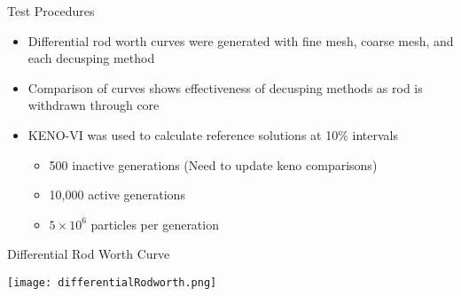 \begin{frame}[t]{Test Procedures}
    
    \begin{itemize}
        \item Differential rod worth curves were generated with fine mesh, coarse mesh, and each decusping method
        \item Comparison of curves shows effectiveness of decusping methods as rod is withdrawn through core
        \item KENO-VI was used to calculate reference solutions at 10\% intervals
        \begin{itemize}
            \item 500 inactive generations (Need to update keno comparisons)
            \item 10,000 active generations
            \item $5\times 10^6$ particles per generation
        \end{itemize}
    \end{itemize}

\end{frame}


\begin{frame}[t]{Differential Rod Worth Curve}
    
\begin{center}
\texttt{[image: differentialRodworth.png]}
\end{center}
    
\end{frame}


